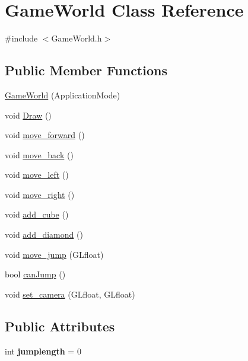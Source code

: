 \hypertarget{classGameWorld}{}\section{Game\+World Class Reference}
\label{classGameWorld}


{\ttfamily \#include $<$Game\+World.\+h$>$}

\subsection*{Public Member Functions}
\begin{DoxyCompactItemize}
\item 
\hyperlink{classGameWorld_a17a84e57a80600961088afc753036f89}{Game\+World} (Application\+Mode)
\item 
void \hyperlink{classGameWorld_a275418607d8286979b276f165ad5876b}{Draw} ()
\item 
void \hyperlink{classGameWorld_a863eb5b4a6d30e050543490b73c03351}{move\+\_\+forward} ()
\item 
void \hyperlink{classGameWorld_a0a6ee18221d04443c70a63951f098f10}{move\+\_\+back} ()
\item 
void \hyperlink{classGameWorld_a87e9cc176c5958342b54e33e76bf6227}{move\+\_\+left} ()
\item 
void \hyperlink{classGameWorld_a96063357a010c28ba7ef3ceb691fc897}{move\+\_\+right} ()
\item 
void \hyperlink{classGameWorld_a6c5708858337e5f863818760011af50f}{add\+\_\+cube} ()
\item 
void \hyperlink{classGameWorld_a0c8016380349f7087dd6ddddcce90f0b}{add\+\_\+diamond} ()
\item 
void \hyperlink{classGameWorld_a827a524c738a252fe1ab87f45fcece71}{move\+\_\+jump} (G\+Lfloat)
\item 
bool \hyperlink{classGameWorld_a9b35d52aa5239be36a480df580c517f8}{can\+Jump} ()
\item 
void \hyperlink{classGameWorld_adf31c1e081b761f1510f0f4053c7f463}{set\+\_\+camera} (G\+Lfloat, G\+Lfloat)
\end{DoxyCompactItemize}
\subsection*{Public Attributes}
\begin{DoxyCompactItemize}
\item 
int {\bfseries jumplength} = 0\hypertarget{classGameWorld_ad2297c4f2d1f8f97bd553a2d1d48a532}{}\label{classGameWorld_ad2297c4f2d1f8f97bd553a2d1d48a532}

\end{DoxyCompactItemize}


